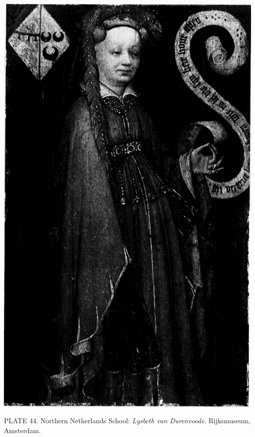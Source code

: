 \protect\hypertarget{20_ILLUSTRATIONS_FOLLOW_PAGE.xhtmlux5cux23id_39}{}{}\includegraphics{include/html/images/359_1.png}

PLATE 44. Northern Netherlands School: \emph{Lysbeth van Durenvoode}.
Rijksmuseum, Amsterdam.

